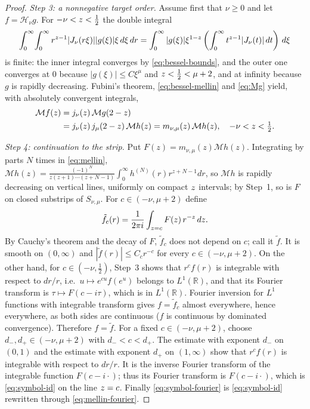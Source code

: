 \documentclass[11pt,a4paper,reqno,backref=page]{amsart}
\newcommand{\R}{\mathbb R}
\newcommand{\HH}{\mathcal H}                 %
\newcommand{\Mell}{\mathcal M}               %
\newcommand{\dd}{\,d}
\let\Re\relax\DeclareMathOperator{\Re}{Re}
\numberwithin{equation}{section}
\theoremstyle{definition}
\theoremstyle{remark}
\begin{document}
\begin{proof}
\emph{Step 3: a nonnegative target order.} Assume first that
$\nu\ge0$ and let $f=\HH_\nu g$. For $-\nu<\Re z<\frac12$ the
double integral
\begin{equation*}
    \int_0^\infty\!\int_0^\infty
    r^{\Re z-1}|J_\nu(r\xi)||g(\xi)|\xi\dd\xi\dd r
    =\int_0^\infty |g(\xi)|\xi^{1-\Re z}
    \left(\int_0^\infty t^{\Re z-1}|J_\nu(t)|\dd t\right)\dd\xi
\end{equation*}
is finite: the inner integral converges by
\eqref{eq:bessel-bounds}, and the outer one converges at $0$
because $|g(\xi)|\le C\xi^\mu$ and $\Re z<\frac12<\mu+2$, and at
infinity because $g$ is rapidly decreasing. Fubini's theorem,
\eqref{eq:bessel-mellin} and \eqref{eq:Mg} yield, with
absolutely convergent integrals,
\begin{equation}\label{eq:Mf-left}
\begin{split}
  \Mell f(z)&=j_\nu(z)\,\Mell g(2-z)\\&=j_\nu(z)\,j_\mu(2-z)\,\Mell
  h(z)
  =m_{\nu,\mu}(z)\,\Mell h(z),\quad -\nu<\Re z<\tfrac12.
  \end{split}
\end{equation}

\emph{Step 4: continuation to the strip.} Put
$F(z)=m_{\nu,\mu}(z)\Mell h(z)$. Integrating by parts $N$ times
in \eqref{eq:mellin}, $\Mell
h(z)=\frac{(-1)^N}{z(z+1)\cdots(z+N-1)}\int_0^\infty
h^{(N)}(r)r^{z+N-1}dr$, so $\Mell h$ is rapidly decreasing on
vertical lines, uniformly on compact $\Re z$ intervals; by
Step~1, so is $F$ on closed substrips of $S_{\nu,\mu}$. For
$c\in(-\nu,\mu+2)$ define
\begin{equation*}
  \tilde f_c(r)=\frac1{2\pi i}\int_{\Re z=c}F(z)\,r^{-z}\dd z.
\end{equation*}
By Cauchy's theorem and the decay of $F$, $\tilde f_c$ does not
depend on $c$; call it $\tilde f$. It is smooth on $(0,\infty)$
and $|\tilde f(r)|\le C_cr^{-c}$ for every $c\in(-\nu,\mu+2)$.
On the other hand, for $c\in(-\nu,\frac12)$, Step~3 shows that
$r^cf(r)$ is integrable with respect to $dr/r$, i.e.\ $u\mapsto
e^{cu}f(e^u)$ belongs to $L^1(\R)$, and that its Fourier
transform is $\tau\mapsto F(c-i\tau)$, which is in $L^1(\R)$.
Fourier inversion for $L^1$ functions with integrable transform
gives $f=\tilde f_c$ almost everywhere, hence everywhere, as
both sides are continuous ($f$ is continuous by dominated
convergence). Therefore $f=\tilde f$. For a fixed
$c\in(-\nu,\mu+2)$, choose $d_-,d_+\in(-\nu,\mu+2)$ with
$d_-<c<d_+$. The estimate with exponent $d_-$ on $(0,1)$ and the
estimate with exponent $d_+$ on $(1,\infty)$ show that $r^cf(r)$
is integrable with respect to $dr/r$. It is the inverse Fourier
transform of the integrable function $F(c-i\cdot)$; thus its
Fourier transform is $F(c-i\cdot)$, which is
\eqref{eq:symbol-id} on the line $\Re z=c$. Finally
\eqref{eq:symbol-fourier} is \eqref{eq:symbol-id} rewritten
through \eqref{eq:mellin-fourier}.


\end{proof}
\end{document}
